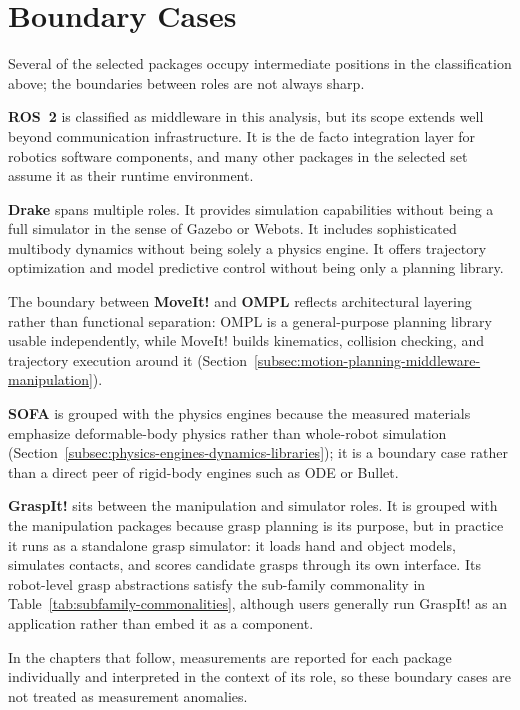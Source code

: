 \let\variationmapheader\relax

\section{Boundary Cases}
\label{sec:boundary-cases}

Several of the selected packages occupy intermediate positions in the classification above; the boundaries between roles are not always sharp.

\textbf{ROS~2} is classified as middleware in this analysis, but its scope extends well beyond communication infrastructure. It is the de facto integration layer for robotics software components, and many other packages in the selected set assume it as their runtime environment.

\textbf{Drake} spans multiple roles. It provides simulation capabilities without being a full simulator in the sense of Gazebo or Webots. It includes sophisticated multibody dynamics without being solely a physics engine. It offers trajectory optimization and model predictive control without being only a planning library.

The boundary between \textbf{MoveIt!} and \textbf{OMPL} reflects architectural layering rather than functional separation: OMPL is a general-purpose planning library usable independently, while MoveIt! builds kinematics, collision checking, and trajectory execution around it (Section~\ref{subsec:motion-planning-middleware-manipulation}).

\textbf{SOFA} is grouped with the physics engines because the measured materials emphasize deformable-body physics rather than whole-robot simulation (Section~\ref{subsec:physics-engines-dynamics-libraries}); it is a boundary case rather than a direct peer of rigid-body engines such as ODE or Bullet.

\textbf{GraspIt!} sits between the manipulation and simulator roles. It is grouped with the manipulation packages because grasp planning is its purpose, but in practice it runs as a standalone grasp simulator: it loads hand and object models, simulates contacts, and scores candidate grasps through its own interface. Its robot-level grasp abstractions satisfy the sub-family commonality in Table~\ref{tab:subfamily-commonalities}, although users generally run GraspIt! as an application rather than embed it as a component.

In the chapters that follow, measurements are reported for each package individually and interpreted in the context of its role, so these boundary cases are not treated as measurement anomalies.
